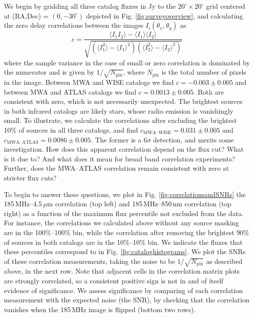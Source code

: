 \documentclass{emulateapj}
\begin{document}
We begin by gridding all three catalog fluxes in Jy to the $20^\circ\times20^\circ$ grid centered at (RA,Dec) = $(0, -30^\circ)$ depicted in Fig. \ref{fig:surveyoverview}, and calculating the zero delay correlations between the images $I_i(\theta_x,\theta_y)$ as
\begin{equation}
\label{eqn:imagecorrdef}
	c = \frac{\langle I_1I_2\rangle-\langle I_1\rangle\langle I_2\rangle}{\sqrt{(\langle I_1^2\rangle -\langle I_1\rangle^2)(\langle I_2^2\rangle -\langle I_2\rangle^2)}}
\end{equation}
where the sample variance in the case of small or zero correlation is dominated by the numerator and is given by $1/\sqrt{N_\text{pix}}$, where $N_\text{pix}$ is the total number of pixels in the image. Between MWA and WISE catalogs we find $c=-0.003\pm0.005$ and between MWA and ATLAS catalogs we find $c=0.0013\pm0.005$. Both are consistent with zero, which is not necessarily unexpected. The brightest sources in both infrared catalogs are likely stars, whose radio emission is vanishingly small. To illustrate, we calculate the correlations after excluding the brightest 10\% of sources in all three catalogs, and find $c_\text{MWA--WISE}=0.031\pm0.005$ and $c_\text{MWA--ATLAS}=0.0086\pm0.005$. The former is a $6\sigma$ detection, and merits some investigation. How does this apparent correlation depend on the flux cut? What is it due to? And what does it mean for broad band correlation experiments? Further, does the MWA--ATLAS correlation remain consistent with zero at stricter flux cuts?

To begin to answer these questions, we plot in Fig. \ref{fig:correlationsandSNRs} the 185\,MHz--4.5\,$\mu$m correlation (top left) and 185\,MHz--850\,nm correlation (top right) as a function of the maximum flux percentile not excluded from the data. For instance, the correlations we calculated above without any source masking are in the 100\%--100\% bin, while the correlation after removing the brightest 90\% of sources in both catalogs are in the 10\%--10\% bin. We indicate the fluxes that these percentiles correspond to in Fig. \ref{fig:cataloghistograms}. We plot the SNRs of these correlation measurements, taking the noise to be $1/\sqrt{N_\text{pix}}$ as described above, in the next row. Note that adjacent cells in the correlation matrix plots are strongly correlated, so a consistent positive sign is not in and of itself evidence of significance. We assess significance by comparing of each correlation measurement with the expected noise (the SNR), by checking that the correlation vanishes when the 185\,MHz image is flipped (bottom two rows).
\end{document}

